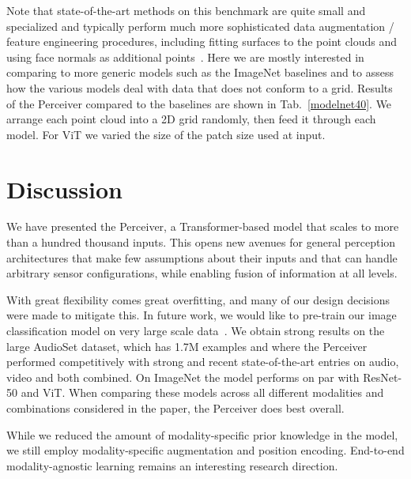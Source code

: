 Note that state-of-the-art methods on this benchmark are quite small and specialized and typically perform much more sophisticated data augmentation / feature engineering procedures, including fitting surfaces to the point clouds and using face normals as additional points~\cite{qi2017pointnet++}. Here we are mostly interested in comparing to more generic models such as the ImageNet baselines and to assess how the various models deal with data that does not conform to a grid. Results of the Perceiver compared to the baselines are shown in Tab.~\ref{modelnet40}. We arrange each point cloud into a 2D grid randomly, then feed it through each model. For ViT we varied the size of the patch size used at input.

\section{Discussion}

We have presented the Perceiver, a Transformer-based model that scales to more than a hundred thousand inputs. This opens new avenues for general perception architectures that make few assumptions about their inputs and that can handle arbitrary sensor configurations, while enabling fusion of information at all levels.

With great flexibility comes great overfitting, and many of our design decisions were made to mitigate this. In future work, we would like to pre-train our image classification model on very large scale data~\cite{dosovitskiy2020image}. We obtain strong results on  the large AudioSet dataset, which has 1.7M examples and where the Perceiver performed competitively with strong and recent state-of-the-art entries on audio, video and both combined. On ImageNet the model performs on par with ResNet-50 and ViT. When comparing these models across all different modalities and combinations considered in the paper, the Perceiver does best overall.

While we reduced the amount of modality-specific prior knowledge in the model, we still employ modality-specific augmentation and position encoding. End-to-end modality-agnostic learning remains an interesting research direction. 


